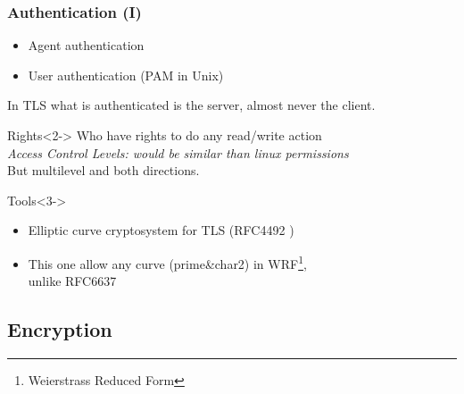 \documentclass{beamer}
\begin{document}
\begin{frame}
\frametitle{Authentication (I)}
    \begin{block}{}
        \begin{itemize}
            \item Agent authentication
            \item User authentication (PAM in Unix)
        \end{itemize}
        In TLS what is authenticated is the server, almost never the client.
    \end{block}
    \begin{block}{Rights}<2->
         Who have rights to do any read/write action\\
         \emph{Access Control Levels: would be similar than linux permissions}\\
         But multilevel and both directions.
    \end{block}
    \begin{alertblock}{Tools}<3->
        \begin{itemize}
            \item Elliptic curve cryptosystem for TLS (RFC4492 \cite{rfc4492})
            \item This one allow any curve (prime\&char2) in WRF\footnote{Weierstrass Reduced Form},\\unlike RFC6637 \cite{rfc6637}
        \end{itemize}
    \end{alertblock}
\end{frame}

\subsection{Encryption}
\end{document}

